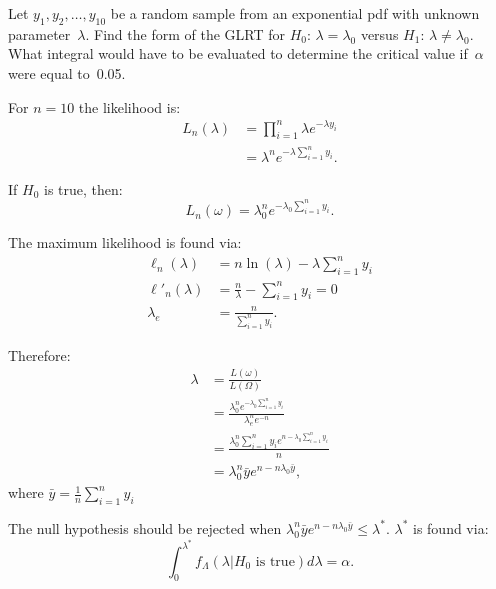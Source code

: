 \begin{problem}
   Let ${y_1,y_2,\ldots,y_{10}}$ be a random sample from an exponential pdf with unknown parameter~$\lambda$. Find the form of the GLRT for $H_0$: ${\lambda = \lambda_0}$ versus ${H_1}$: ${\lambda \ne \lambda_0}$.  What integral would have to be evaluated to determine the critical value if~$\alpha$ were equal to~0.05.
\end{problem}

For ${n=10}$ the likelihood is:
\begin{align}
  L_{n}(\lambda) &= \prod_{i=1}^{n} \lambda e^{-\lambda y_i} \\
                 &= \lambda^{n} e^{-\lambda \sum_{i=1}^{n} y_i} \text{.}
\end{align}

If ${H_0}$ is true, then:
\begin{equation}
  L_{n}(\omega) = \lambda_{0}^{n}  e^{-\lambda_0 \sum_{i=1}^n y_i} \text{.}
\end{equation}

The maximum likelihood is found via:
\begin{align}
  \ell_{n}(\lambda)   &= n \ln (\lambda) - \lambda \sum_{i=1}^{n} y_i \\
  \ell'_{n}(\lambda)  &= \frac{n}{\lambda} - \sum_{i=1}^{n} y_i = 0 \\
          \lambda_{e} &= \frac{n}{\sum_{i=1}^{n} y_i} \text{.}
\end{align}

Therefore:
\begin{align}
  \lambda &= \frac{L(\omega)}{L(\Omega)} \\
          &= \frac{\lambda_{0}^{n}  e^{-\lambda_0 \sum_{i=1}^n y_i}}{\lambda_{e}^{n}  e^{-n}} \\
          &= \frac{\lambda_{0}^{n} \sum_{i=1}^n y_i e^{n -\lambda_0 \sum_{i=1}^n y_i}}{n} \\
          &= \lambda_{0}^{n} \bar{y} e^{n -n \lambda_0 \bar{y}} \text{,}
\end{align}
\noindent
where ${\bar{y} = \frac{1}{n} \sum_{i=1}^{n} y_i}$

The null hypothesis should be rejected when ${\lambda_{0}^{n} \bar{y} e^{n -n \lambda_0 \bar{y}} \leq \lambda^{*}}$.  $\lambda^{*}$ is found via:
\begin{equation}
  \int_{0}^{\lambda^*} f_{\Lambda} (\lambda \vert H_0 \text{ is true}) d\lambda = \alpha \text{.}
\end{equation}
